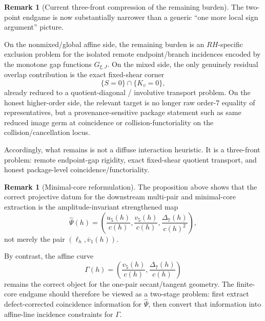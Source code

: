 \documentclass[11pt,a4paper]{amsart}
\def\RH{RH}%
\theoremstyle{plain}
\theoremstyle{definition}
\newtheorem{remark}[theorem]{Remark}
\newcommand{\RH}{\mathrm{RH}}
\begin{document}
\begin{remark}[Current three-front compression of the remaining burden]
\label{rem:current-three-front-compression-two-point-endgame}
The two-point endgame is now substantially narrower than a generic
``one more local sign argument'' picture.

On the nonmixed/global affine side, the remaining burden is an
$\RH$-specific exclusion problem for the isolated remote endpoint/branch
incidences encoded by the monotone gap functions $G_{\xi,J}$.
On the mixed side, the only genuinely residual overlap contribution is the
exact fixed-shear corner
\[
\{S=0\}\cap\{K_v=0\},
\]
already reduced to a quotient-diagonal / involutive transport problem.
On the honest higher-order side, the relevant target is no longer raw
order-$7$ equality of representatives, but a provenance-sensitive package
statement such as same reduced image germ at coincidence or
collision-functoriality on the collision/cancellation locus.

Accordingly, what remains is not a diffuse interaction heuristic.
It is a three-front problem: remote endpoint-gap rigidity, exact fixed-shear
quotient transport, and honest package-level coincidence/functoriality.
\end{remark}

\begin{remark}[Minimal-core reformulation]
\label{rem:minimal-core-reformulation}
The proposition above shows that the correct projective datum for the downstream
multi-pair and minimal-core extraction is the amplitude-invariant strengthened
map
\[
\widehat\Psi(h)=
\left(
\frac{u_5(h)}{c(h)},
\frac{v_5(h)}{c(h)},
\frac{\Delta_7(h)}{c(h)^2}
\right),
\]
not merely the pair $(\ell_h,\overline v_1(h))$.

By contrast, the affine curve
\[
\Gamma(h)=\left(\frac{v_5(h)}{c(h)},\frac{\Delta_7(h)}{c(h)}\right)
\]
remains the correct object for the one-pair secant/tangent geometry. The
finite-core endgame should therefore be viewed as a two-stage problem:
first extract defect-corrected coincidence information for $\widehat\Psi$,
then convert that information into affine-line incidence constraints for
$\Gamma$.
\end{remark}
\end{document}
